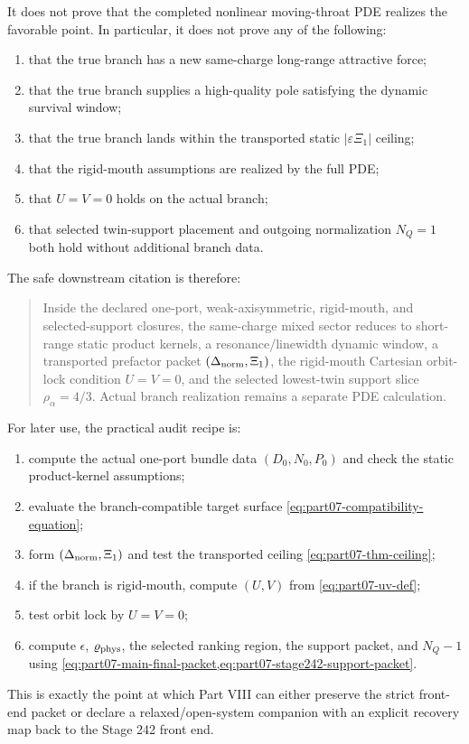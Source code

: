 It does not prove that the completed nonlinear moving-throat PDE realizes the favorable point.  In particular, it does not prove any of the following:
\begin{enumerate}[leftmargin=2.2em]
  \item that the true branch has a new same-charge long-range attractive force;
  \item that the true branch supplies a high-quality pole satisfying the dynamic survival window;
  \item that the true branch lands within the transported static \(|\varepsilon\Xi_1|\) ceiling;
  \item that the rigid-mouth assumptions are realized by the full PDE;
  \item that \(U=V=0\) holds on the actual branch;
  \item that selected twin-support placement and outgoing normalization \(N_Q=1\) both hold without additional branch data.
\end{enumerate}

The safe downstream citation is therefore:
\begin{quote}
Inside the declared one-port, weak-axisymmetric, rigid-mouth, and selected-support closures, the same-charge mixed sector reduces to short-range static product kernels, a resonance/linewidth dynamic window, a transported prefactor packet \((\Delta_{\rm norm},\Xi_1)\), the rigid-mouth Cartesian orbit-lock condition \(U=V=0\), and the selected lowest-twin support slice \(\rho_\alpha=4/3\).  Actual branch realization remains a separate PDE calculation.
\end{quote}

For later use, the practical audit recipe is:
\begin{enumerate}[leftmargin=2.2em]
  \item compute the actual one-port bundle data \((D_0,N_0,P_0)\) and check the static product-kernel assumptions;
  \item evaluate the branch-compatible target surface \cref{eq:part07-compatibility-equation};
  \item form \((\Delta_{\rm norm},\Xi_1)\) and test the transported ceiling \cref{eq:part07-thm-ceiling};
  \item if the branch is rigid-mouth, compute \((U,V)\) from \cref{eq:part07-uv-def};
  \item test orbit lock by \(U=V=0\);
  \item compute \(\epsilon\), \(\varrho_{\rm phys}\), the selected ranking region, the support packet, and \(N_Q-1\) using \cref{eq:part07-main-final-packet,eq:part07-stage242-support-packet}.
\end{enumerate}
This is exactly the point at which Part VIII can either preserve the strict front-end packet or declare a relaxed/open-system companion with an explicit recovery map back to the Stage 242 front end.
